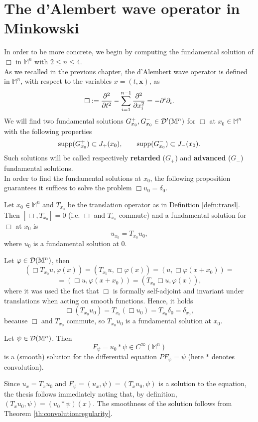 \section{The d'Alembert wave operator in Minkowski}
In order to be more concrete, we begin by computing the fundamental solution of $\Box$ in $\mathbb{M}^n$ with $2\leq n\leq 4$.\\
As we recalled in the previous chapter, the d'Alembert wave operator is defined in $\mathbb{M}^n$, with respect to the variables $x=(t,\mathbf{x})$, as $$\displaystyle\Box:=\frac{\partial^2}{\partial t^2}-\sum_{i=1}^{n-1}\frac{\partial^2}{\partial x_i^2}=-\partial^i\partial_i.$$
We will find two fundamental solutions $G_{x_0}^+,G_{x_0}^-\in\mathcal{D}'(\mathbb{M}^n)$ for $\Box$ at $x_0\in \mathbb{M}^n$ with the following properties
\begin{equation}
	\text{supp}(G_{x_0}^+)	\subset J_+(x_0),\qquad \text{supp}(G_{x_0}^-)	\subset J_-(x_0).
	\label{eq:supporti}
\end{equation}
Such solutions will be called respectively \textbf{retarded} ($G_+$) and \textbf{advanced} ($G_-$) fundamental solutions.\\
In order to find the fundamental solutions at $x_0$, the following proposition guarantees it suffices to solve the problem $\Box u_0=\delta_0$.
\begin{prop}
	Let $x_0\in\mathbb{M}^n$ and $T_{x_0}$ be the translation operator as in Definition \ref{defn:transl}. Then $[\Box,T_{x_0}]=0$ (i.e. $\Box$ and $T_{x_0}$ commute) and a fundamental solution for $\Box$ at $x_0$ is
	\[	u_{x_0}=T_{x_0}u_0,	\]	
	where $u_0$ is a fundamental solution at $0$.
\end{prop}
	
\Proof Let $\varphi\in\mathcal{D}(\mathbb{M}^n)$, then
\[	\left(\Box T_{x_0}u,\varphi(x)\right)=\left( T_{x_0}u,\Box\varphi(x)\right)=\left( u,\Box\varphi(x+x_0)\right)=	\]
\[	=\left(\Box u,\varphi(x+x_0)\right)=\left(T_{x_0}\Box u,\varphi(x)\right),	\]where it was used the fact that $\Box$ is formally self-adjoint and invariant under translations when acting on smooth functions. 
Hence, it holds
\[\Box\left(T_{x_0}u_0\right)=	T_{x_0}\left(\Box u_0\right)=T_{x_0}\delta_0=\delta_{x_0},	\]
because $\Box$ and $T_{x_0}$ commute, so $T_{x_0}u_0$ is a fundamental solution at $x_0$.  \endproof\\

\begin{prop}
	Let $\psi\in\mathcal{D}(\mathbb{M}^n)$. Then
	\begin{equation}
		F_\psi=u_0*\psi\in C^\infty(\mathbb{M}^n)
	\end{equation}
	is a (smooth) solution for the differential equation
	$	PF_\psi=\psi$ (here $*$ denotes convolution).
	\label{prop:regularity}
\end{prop}
\Proof Since $u_x=T_xu_0$ and $F_\psi=(u_x,\psi)=(T_xu_0,\psi)$ is a solution to the equation, the thesis follows immediately noting that, by definition, $(T_xu_0,\psi)=(u_0*\psi)(x)$. The smoothness of the solution follows from Theorem \ref{th:convolutionregularity}.\endproof

